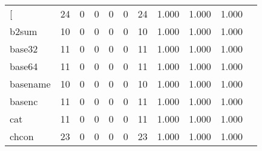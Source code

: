 \begin{longtable}{lp{1.10cm}p{1.10cm}p{1.10cm}p{1.10cm}p{1.10cm}p{1.10cm}p{1.10cm}p{1.10cm}p{1.10cm}p{1.10cm}}
\bottomrule
\endlastfoot
{[}         &                     24 &                                  0 &                                 0 &                                0 &                                 0 &                              24 &                          1.000 &                                 1.000 &                               1.000 \\
b2sum     &                     10 &                                  0 &                                 0 &                                0 &                                 0 &                              10 &                          1.000 &                                 1.000 &                               1.000 \\
base32    &                     11 &                                  0 &                                 0 &                                0 &                                 0 &                              11 &                          1.000 &                                 1.000 &                               1.000 \\
base64    &                     11 &                                  0 &                                 0 &                                0 &                                 0 &                              11 &                          1.000 &                                 1.000 &                               1.000 \\
basename  &                     10 &                                  0 &                                 0 &                                0 &                                 0 &                              10 &                          1.000 &                                 1.000 &                               1.000 \\
basenc    &                     11 &                                  0 &                                 0 &                                0 &                                 0 &                              11 &                          1.000 &                                 1.000 &                               1.000 \\
cat       &                     11 &                                  0 &                                 0 &                                0 &                                 0 &                              11 &                          1.000 &                                 1.000 &                               1.000 \\
chcon     &                     23 &                                  0 &                                 0 &                                0 &                                 0 &                              23 &                          1.000 &                                 1.000 &                               1.000 \\

\end{longtable}
